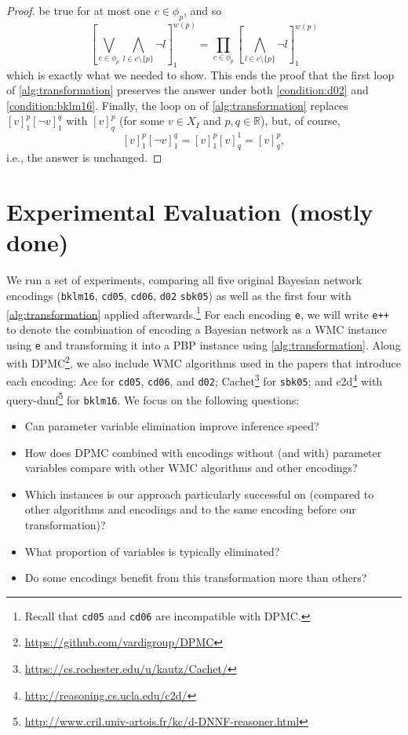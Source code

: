 \documentclass[runningheads]{llncs}
\begin{document}
\begin{proof}
   be true for at most one $c \in \phi_p$, and so
   \[
     \left[ \bigvee_{c \in \phi_p} \bigwedge_{l \in c \setminus \{ p \}} \neg l
     \right]_1^{w(p)} = \prod_{c \in \phi_p} \left[ \bigwedge_{l \in c \setminus
         \{ p \}} \neg l \right]_1^{w(p)}
   \]
   which is exactly what we needed to show. This ends the proof that the
   first loop of \cref{alg:transformation} preserves the answer under both
   \cref{condition:d02} and \cref{condition:bklm16}. Finally, the loop on
    of \cref{alg:transformation}
   replaces $[v]_1^p[\neg v]_1^q$ with $[v]_q^p$ (for some $v \in X_I$ and $p, q
   \in \mathbb{R}$), but, of course,
   \[
     [v]_1^p[\neg v]_1^q = [v]_1^p[v]_q^1 = [v]_q^p,
   \]
   i.e., the answer is unchanged.
\end{proof}

\section{Experimental Evaluation (mostly done)}

We run a set of experiments, comparing all five original Bayesian network
encodings (\texttt{bklm16}, \texttt{cd05}, \texttt{cd06}, \texttt{d02}
\texttt{sbk05}) as well as the first four with \cref{alg:transformation} applied
afterwards.\footnote{Recall that \texttt{cd05} and \texttt{cd06} are
  incompatible with \textsf{DPMC}.} For each encoding \texttt{e}, we will write
\texttt{e++} to denote the combination of encoding a Bayesian network as a WMC
instance using \texttt{e} and transforming it into a PBP instance using
\cref{alg:transformation}. Along with
\textsf{DPMC}\footnote{\url{https://github.com/vardigroup/DPMC}}, we also
include WMC algorithms used in the papers that introduce each encoding:
\textsf{Ace} for \texttt{cd05}, \texttt{cd06}, and \texttt{d02};
\textsf{Cachet}\footnote{\url{https://cs.rochester.edu/u/kautz/Cachet/}}
\cite{DBLP:conf/sat/SangBBKP04} for \texttt{sbk05}; and
\textsf{c2d}\footnote{\url{http://reasoning.cs.ucla.edu/c2d/}}
\cite{DBLP:conf/ecai/Darwiche04} with
\textsf{query-dnnf}\footnote{\url{http://www.cril.univ-artois.fr/kc/d-DNNF-reasoner.html}}
for \texttt{bklm16}. We focus on the following questions:
\begin{itemize}
\item Can parameter variable elimination improve inference speed?
\item How does DPMC combined with encodings without (and with) parameter
  variables compare with other WMC algorithms and other encodings?
\item Which instances is our approach particularly successful on (compared to
  other algorithms and encodings and to the same encoding before our
  transformation)?
\item What proportion of variables is typically eliminated?
\item Do some encodings benefit from this transformation more than others?
\end{itemize}
\end{document}
